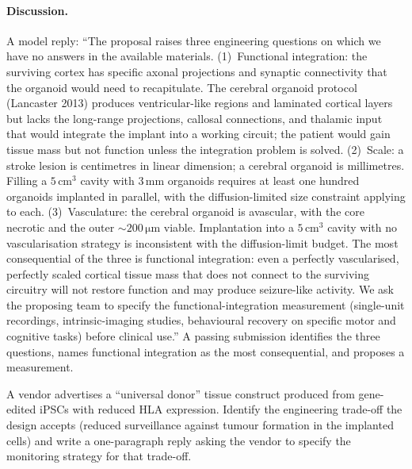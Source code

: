 \paragraph{Discussion.} A model reply: ``The proposal raises three
engineering questions on which we have no answers in the available
materials. (1)~Functional integration: the surviving cortex has
specific axonal projections and synaptic connectivity that the
organoid would need to recapitulate. The cerebral organoid protocol
(Lancaster 2013) produces ventricular-like regions and laminated
cortical layers but lacks the long-range projections, callosal
connections, and thalamic input that would integrate the implant
into a working circuit; the patient would gain tissue mass but not
function unless the integration problem is solved. (2)~Scale: a
stroke lesion is centimetres in linear dimension; a cerebral
organoid is millimetres. Filling a $5\,\text{cm}^3$ cavity with
$3\,\text{mm}$ organoids requires at least one hundred organoids
implanted in parallel, with the diffusion-limited size constraint
applying to each. (3)~Vasculature: the cerebral organoid is
avascular, with the core necrotic and the outer
$\sim 200\,\si{\micro\meter}$ viable. Implantation into a
$5\,\text{cm}^3$ cavity with no vascularisation strategy is
inconsistent with the diffusion-limit budget. The most consequential
of the three is functional integration: even a perfectly
vascularised, perfectly scaled cortical tissue mass that does not
connect to the surviving circuitry will not restore function and
may produce seizure-like activity. We ask the proposing team to
specify the functional-integration measurement (single-unit
recordings, intrinsic-imaging studies, behavioural recovery on
specific motor and cognitive tasks) before clinical use.'' A passing
submission identifies the three questions, names functional
integration as the most consequential, and proposes a measurement.

\begin{exercise}
A vendor advertises a ``universal donor'' tissue construct produced
from gene-edited iPSCs with reduced HLA expression. Identify the
engineering trade-off the design accepts (reduced surveillance against
tumour formation in the implanted cells) and write a one-paragraph
reply asking the vendor to specify the monitoring strategy for that
trade-off.
\end{exercise}

